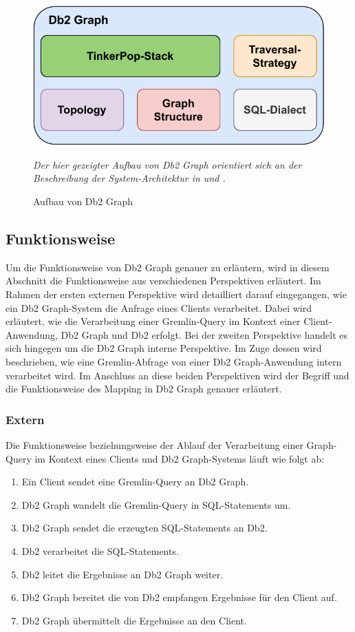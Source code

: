 \begin{figure}[h]
    \centering
    \includegraphics[width=\textwidth]{images/db2graph_components.pdf}
    \caption{Aufbau von Db2 Graph}
    \label{fig:db2graph_aufbau}
    \vspace{0.5em}
    \textit{Der hier gezeigter Aufbau von Db2 Graph   orientiert sich an der Beschreibung der System-Architektur in \cite{vldb_tian} und \cite{sigmod_tian}.}
\end{figure}

\subsection{Funktionsweise}
\label{db2graph:funktionsweise}
Um die Funktionsweise von Db2 Graph genauer zu erläutern, wird in diesem Abschnitt die Funktionsweise aus verschiedenen Perspektiven erläutert. Im Rahmen der ersten externen Perspektive wird detailliert darauf eingegangen, wie ein Db2 Graph-System die Anfrage eines Clients verarbeitet. Dabei wird erläutert, wie die Verarbeitung einer Gremlin-Query im Kontext einer Client-Anwendung, Db2 Graph und Db2 erfolgt. Bei der zweiten Perspektive handelt es sich hingegen um die Db2 Graph interne Perspektive. Im Zuge dessen wird beschrieben, wie eine Gremlin-Abfrage von einer Db2 Graph-Anwendung intern verarbeitet wird. Im Anschluss an diese beiden Perspektiven wird der Begriff und die Funktionsweise des Mapping in Db2 Graph genauer erläutert.

\subsubsection{Extern}
Die Funktionsweise beziehungsweise der Ablauf der Verarbeitung einer Graph-Query im Kontext eines Clients und Db2 Graph-Systems läuft wie folgt ab:

\begin{enumerate}
    \item Ein Client sendet eine Gremlin-Query an Db2 Graph. 
    \item Db2 Graph wandelt die Gremlin-Query in SQL-Statements um. 
    \item Db2 Graph sendet die erzeugten SQL-Statements an Db2.
    \item Db2 verarbeitet die SQL-Statements.
    \item Db2 leitet die Ergebnisse an Db2 Graph weiter.
    \item Db2 Graph bereitet die von Db2 empfangen Ergebnisse für den Client auf. 
    \item Db2 Graph übermittelt die Ergebnisse an den Client.
\end{enumerate}

